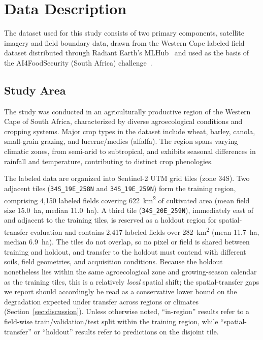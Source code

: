 \documentclass[pdflatex,sn-mathphys]{sn-jnl} %
\begin{document}
\section{Data Description}

The dataset used for this study consists of two primary components, satellite imagery and field boundary data, drawn from the Western Cape labeled field dataset distributed through Radiant Earth's MLHub~\cite{mlhub} and used as the basis of the AI4FoodSecurity (South Africa) challenge~\cite{ai4foodsecurity}.

\subsection{Study Area}

The study was conducted in an agriculturally productive region of the Western Cape of South Africa, characterized by diverse agroecological conditions and cropping systems. Major crop types in the dataset include wheat, barley, canola, small-grain grazing, and lucerne/medics (alfalfa). The region spans varying climatic zones, from semi-arid to subtropical, and exhibits seasonal differences in rainfall and temperature, contributing to distinct crop phenologies.

The labeled data are organized into Sentinel-2 UTM grid tiles (zone 34S). Two adjacent tiles (\texttt{34S\_19E\_258N} and \texttt{34S\_19E\_259N}) form the training region, comprising 4{,}150 labeled fields covering 622~km\textsuperscript{2} of cultivated area (mean field size 15.0~ha, median 11.0~ha). A third tile (\texttt{34S\_20E\_259N}), immediately east of and adjacent to the training tiles, is reserved as a holdout region for spatial-transfer evaluation and contains 2{,}417 labeled fields over 282~km\textsuperscript{2} (mean 11.7~ha, median 6.9~ha). The tiles do not overlap, so no pixel or field is shared between training and holdout, and transfer to the holdout must contend with different soils, field geometries, and acquisition conditions. Because the holdout nonetheless lies within the same agroecological zone and growing-season calendar as the training tiles, this is a relatively \emph{local} spatial shift; the spatial-transfer gaps we report should accordingly be read as a conservative lower bound on the degradation expected under transfer across regions or climates (Section~\ref{sec:discussion}). Unless otherwise noted, ``in-region'' results refer to a field-wise train/validation/test split within the training region, while ``spatial-transfer'' or ``holdout'' results refer to predictions on the disjoint tile.
\end{document}
